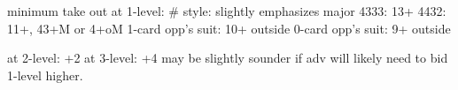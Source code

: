 minimum take out at 1-level:  # style: slightly emphasizes major
4333: 13+
4432: 11+, 43+M or 4+oM
1-card opp's suit: 10+ outside
0-card opp's suit: 9+ outside

at 2-level: +2
at 3-level: +4
may be slightly sounder if adv will likely need to bid 1-level higher.